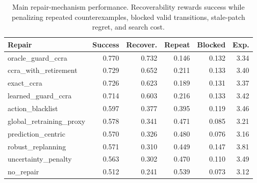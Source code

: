 \begin{table}[t]
\centering
\caption{Main repair-mechanism performance. Recoverability rewards success while penalizing repeated counterexamples, blocked valid transitions, stale-patch regret, and search cost.}
\label{tab:main-performance}
\small
\begin{tabular}{lrrrrr}
\toprule
Repair & Success & Recover. & Repeat & Blocked & Exp. \\
\midrule
oracle\_guard\_ccra & 0.770 & 0.732 & 0.146 & 0.132 & 3.34 \\
ccra\_with\_retirement & 0.729 & 0.652 & 0.211 & 0.133 & 3.40 \\
exact\_ccra & 0.726 & 0.623 & 0.189 & 0.131 & 3.37 \\
learned\_guard\_ccra & 0.714 & 0.603 & 0.216 & 0.133 & 3.42 \\
action\_blacklist & 0.597 & 0.377 & 0.395 & 0.119 & 3.46 \\
global\_retraining\_proxy & 0.578 & 0.341 & 0.471 & 0.085 & 3.21 \\
prediction\_centric & 0.570 & 0.326 & 0.480 & 0.076 & 3.16 \\
robust\_replanning & 0.571 & 0.310 & 0.449 & 0.147 & 3.81 \\
uncertainty\_penalty & 0.563 & 0.302 & 0.470 & 0.110 & 3.49 \\
no\_repair & 0.512 & 0.241 & 0.539 & 0.073 & 3.12 \\
\bottomrule
\end{tabular}
\end{table}
